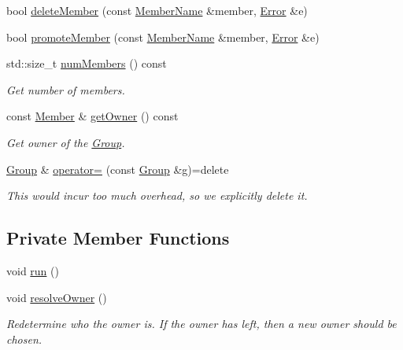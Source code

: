 \begin{DoxyCompactItemize}
\item 
bool \hyperlink{classshaan97_1_1sync_1_1_group_a3dc73fcdebd5cbdb1203b16946e283e7}{delete\+Member} (const \hyperlink{namespaceshaan97_1_1sync_af59c2c9185f7cde547b79fbe0bf8ec71}{Member\+Name} \&member, \hyperlink{classshaan97_1_1sync_1_1_error}{Error} \&e)
\item 
bool \hyperlink{classshaan97_1_1sync_1_1_group_a30933945f82c16ef06d93d6aa2f39147}{promote\+Member} (const \hyperlink{namespaceshaan97_1_1sync_af59c2c9185f7cde547b79fbe0bf8ec71}{Member\+Name} \&member, \hyperlink{classshaan97_1_1sync_1_1_error}{Error} \&e)
\item 
std\+::size\+\_\+t \hyperlink{classshaan97_1_1sync_1_1_group_ad887e0961f8c1abe04db7c73b1d4bcd2}{num\+Members} () const
\begin{DoxyCompactList}\small\item\em Get number of members. \end{DoxyCompactList}\item 
const \hyperlink{classshaan97_1_1sync_1_1_member}{Member} \& \hyperlink{classshaan97_1_1sync_1_1_group_a3d6110a503531f2179ed290b20242bf5}{get\+Owner} () const
\begin{DoxyCompactList}\small\item\em Get owner of the \hyperlink{classshaan97_1_1sync_1_1_group}{Group}. \end{DoxyCompactList}\item 
\hyperlink{classshaan97_1_1sync_1_1_group}{Group} \& \hyperlink{classshaan97_1_1sync_1_1_group_a76250fe9ddae378fd684b12b9f9b6172}{operator=} (const \hyperlink{classshaan97_1_1sync_1_1_group}{Group} \&g)=delete
\begin{DoxyCompactList}\small\item\em This would incur too much overhead, so we explicitly delete it. \end{DoxyCompactList}\end{DoxyCompactItemize}
\subsection*{Private Member Functions}
\begin{DoxyCompactItemize}
\item 
void \hyperlink{classshaan97_1_1sync_1_1_group_a916b46aaf2fecb3694089a83850f061a}{run} ()
\item 
void \hyperlink{classshaan97_1_1sync_1_1_group_a4925f72201a7c780581220aa404fdab9}{resolve\+Owner} ()
\begin{DoxyCompactList}\small\item\em Redetermine who the owner is. If the owner has left, then a new owner should be chosen. \end{DoxyCompactList}\end{DoxyCompactItemize}
